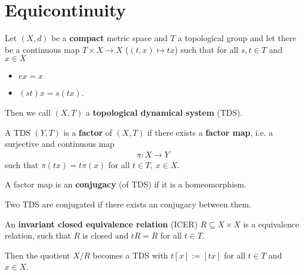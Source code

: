 \section{Equicontinuity}

\begin{frame}
	\begin{definition}
		Let $(X, d)$ be a \textbf{compact} metric space and $T$ a topological group and let there be a continuous map $T \times X \to X$ ($(t, x) \mapsto tx$) such that for all $s, t \in T$ and $x \in X$
		\begin{itemize}
			\item $ex = x$
			\item $(st)x = s(tx)$.
		\end{itemize}
		Then we call $(X, T)$ a \textbf{topological dynamical system} (TDS).
	\end{definition}
	\begin{overlayarea}{\textwidth}{3.5cm}
	\begin{minipage}{\textwidth}
	\end{minipage}
	\end{overlayarea}
\end{frame}

\begin{frame}
	\begin{definition}
		A TDS $(Y, T)$ is a \textbf{factor} of $(X, T)$ if there exists a \textbf{factor map}, i.e. a surjective and continuous map
		\begin{align*}
			\pi: X \to Y
		\end{align*}
		such that $\pi(tx) = t\pi(x)$ for all $t \in T,\ x \in X$.\pause
		
		A factor map is an \textbf{conjugacy} (of TDS) if it is a homeomorphism.
		
		Two TDS are conjugated if there exists an conjugacy between them.\pause
	\end{definition}
	\begin{definition}
		An \textbf{invariant closed equivalence relation} (ICER) $R \subseteq X \times X$ is a equivalence relation, such that $R$ is closed and $tR = R$ for all $t \in T$.\pause
		
		Then the quotient $X/R$ becomes a TDS with $t[x] := [tx]$ for all $t \in T$ and $x \in X$.
	\end{definition}
\end{frame}

